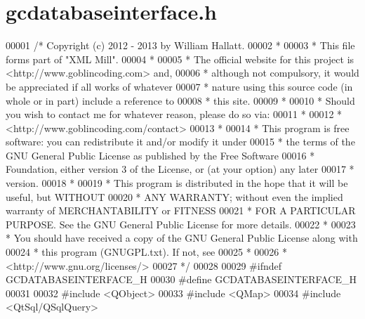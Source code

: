 \hypertarget{gcdatabaseinterface_8h_source}{\section{gcdatabaseinterface.\-h}
}

\begin{DoxyCode}
00001 \textcolor{comment}{/* Copyright (c) 2012 - 2013 by William Hallatt.}
00002 \textcolor{comment}{ *}
00003 \textcolor{comment}{ * This file forms part of "XML Mill".}
00004 \textcolor{comment}{ *}
00005 \textcolor{comment}{ * The official website for this project is <http://www.goblincoding.com> and,}
00006 \textcolor{comment}{ * although not compulsory, it would be appreciated if all works of whatever}
00007 \textcolor{comment}{ * nature using this source code (in whole or in part) include a reference to}
00008 \textcolor{comment}{ * this site.}
00009 \textcolor{comment}{ *}
00010 \textcolor{comment}{ * Should you wish to contact me for whatever reason, please do so via:}
00011 \textcolor{comment}{ *}
00012 \textcolor{comment}{ *                 <http://www.goblincoding.com/contact>}
00013 \textcolor{comment}{ *}
00014 \textcolor{comment}{ * This program is free software: you can redistribute it and/or modify it
       under}
00015 \textcolor{comment}{ * the terms of the GNU General Public License as published by the Free
       Software}
00016 \textcolor{comment}{ * Foundation, either version 3 of the License, or (at your option) any later}
00017 \textcolor{comment}{ * version.}
00018 \textcolor{comment}{ *}
00019 \textcolor{comment}{ * This program is distributed in the hope that it will be useful, but WITHOUT}
00020 \textcolor{comment}{ * ANY WARRANTY; without even the implied warranty of MERCHANTABILITY or
       FITNESS}
00021 \textcolor{comment}{ * FOR A PARTICULAR PURPOSE.  See the GNU General Public License for more
       details.}
00022 \textcolor{comment}{ *}
00023 \textcolor{comment}{ * You should have received a copy of the GNU General Public License along with}
00024 \textcolor{comment}{ * this program (GNUGPL.txt).  If not, see}
00025 \textcolor{comment}{ *}
00026 \textcolor{comment}{ *                    <http://www.gnu.org/licenses/>}
00027 \textcolor{comment}{ */}
00028 
00029 \textcolor{preprocessor}{#ifndef GCDATABASEINTERFACE\_H}
00030 \textcolor{preprocessor}{}\textcolor{preprocessor}{#define GCDATABASEINTERFACE\_H}
00031 \textcolor{preprocessor}{}
00032 \textcolor{preprocessor}{#include <QObject>}
00033 \textcolor{preprocessor}{#include <QMap>}
00034 \textcolor{preprocessor}{#include <QtSql/QSqlQuery>}

\end{DoxyCode}
